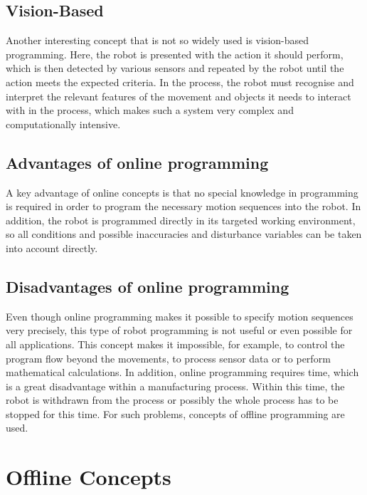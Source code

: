 \documentclass[conference]{IEEEtran}
\begin{document}
    \subsection{Vision-Based}
        Another interesting concept that is not so widely used is vision-based programming. Here, the robot is presented with the action it should perform, which is then detected by various sensors and repeated by the robot until the action meets the expected criteria. \cite[p. 178]{b5} %
        In the process, the robot must recognise and interpret the relevant features of the movement and objects it needs to interact with in the process, \cite[p. 7]{p4} %
        which makes such a system very complex and computationally intensive. \cite[p. 300]{p5} %

    \subsection{Advantages of online programming}
        A key advantage of online concepts is that no special knowledge in programming is required in order to program the necessary motion sequences into the robot. In addition, the robot is programmed directly in its targeted working environment, so all conditions and possible inaccuracies and disturbance variables can be taken into account directly. \cite[p. 92]{b6} %

    \subsection{Disadvantages of online programming}
        Even though online programming makes it possible to specify motion sequences very precisely, this type of robot programming is not useful or even possible for all applications. This concept makes it impossible, for example, to control the program flow beyond the movements, to process sensor data or to perform mathematical calculations. In addition, online programming requires time, which is a great disadvantage within a manufacturing process. Within this time, the robot is withdrawn from the process or possibly the whole process has to be stopped for this time. For such problems, concepts of offline programming are used. \cite[pp. 190-191]{b4}%

\section{Offline Concepts}
\end{document}
